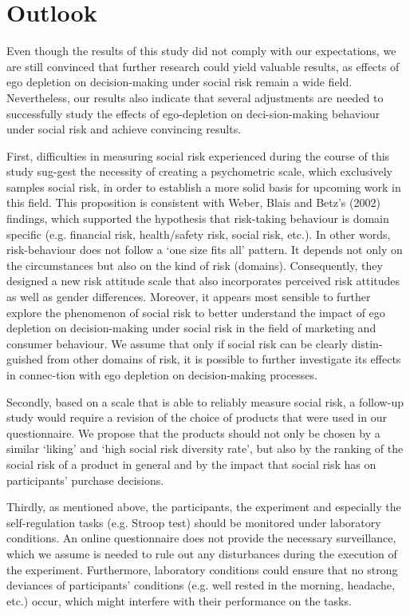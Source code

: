 \section{Outlook}
Even though the results of this study did not comply with our expectations, we are still convinced that further research could yield valuable results, as effects of ego depletion on decision-making under social risk remain a wide field. Nevertheless, our results also indicate that several adjustments are needed to successfully study the effects of ego-depletion on deci-sion-making behaviour under social risk and achieve convincing results.\par
First, difficulties in measuring social risk experienced during the course of this study sug-gest the necessity of creating a psychometric scale, which exclusively samples social risk, in order to establish a more solid basis for upcoming work in this field. This proposition is consistent with Weber, Blais and Betz’s (2002) findings, which supported the hypothesis that risk-taking behaviour is domain specific (e.g. financial risk, health/safety risk, social risk, etc.). In other words, risk-behaviour does not follow a ‘one size fits all’ pattern. It depends not only on the circumstances but also on the kind of risk (domains). Consequently, they designed a new risk attitude scale that also incorporates perceived risk attitudes as well as gender differences. Moreover, it appears most sensible to further explore the phenomenon of social risk to better understand the impact of ego depletion on decision-making under social risk in the field of marketing and consumer behaviour. We assume that only if social risk can be clearly distin-guished from other domains of risk, it is possible to further investigate its effects in connec-tion with ego depletion on decision-making processes.\par
Secondly, based on a scale that is able to reliably measure social risk, a follow-up study would require a revision of the choice of products that were used in our questionnaire. We propose that the products should not only be chosen by a similar ‘liking’ and ‘high social risk diversity rate’, but also by the ranking of the social risk of a product in general and by the impact that social risk has on participants’ purchase decisions.\par
Thirdly, as mentioned above, the participants, the experiment and especially the self-regulation tasks (e.g. Stroop test) should be monitored under laboratory conditions. An online questionnaire does not provide the necessary surveillance, which we assume is needed to rule out any disturbances during the execution of the experiment. Furthermore, laboratory conditions could ensure that no strong deviances of participants’ conditions (e.g. well rested in the morning, headache, etc.) occur, which might interfere with their performance on the tasks. \par
